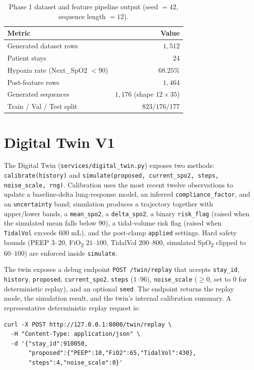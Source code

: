 \documentclass[12pt,a4paper,oneside]{report}
\begin{document}
\begin{table}[h]
\centering
\caption{Phase 1 dataset and feature pipeline output (seed $=42$, sequence length $=12$).}
\label{tab:phase1}
\begin{tabular}{lr}
\toprule
\textbf{Metric} & \textbf{Value}\\
\midrule
Generated dataset rows & $1{,}512$\\
Patient stays & $24$\\
Hypoxia rate (Next\_SpO2 $<90$) & $68.25\%$\\
Post-feature rows & $1{,}464$\\
Generated sequences & $1{,}176$ (shape $12 \times 35$)\\
Train / Val / Test split & $823 / 176 / 177$\\
\bottomrule
\end{tabular}
\end{table}

\section{Digital Twin V1}
The Digital Twin (\texttt{services/digital\_twin.py}) exposes two methods: \texttt{calibrate(history)} and \texttt{simulate(proposed, current\_spo2, steps, noise\_scale, rng)}. Calibration uses the most recent twelve observations to update a baseline-delta lung-response model, an inferred \texttt{compliance\_factor}, and an \texttt{uncertainty} band; simulation produces a trajectory together with upper/lower bands, a \texttt{mean\_spo2}, a \texttt{delta\_spo2}, a binary \texttt{risk\_flag} (raised when the simulated mean falls below $90$), a tidal-volume risk flag (raised when \texttt{TidalVol} exceeds $600$ mL), and the post-clamp \texttt{applied} settings. Hard safety bounds (PEEP $3$--$20$, FiO\textsubscript{2} $21$--$100$, TidalVol $200$--$800$, simulated SpO\textsubscript{2} clipped to $60$--$100$) are enforced inside \texttt{simulate}.

The twin exposes a debug endpoint \texttt{POST /twin/replay} that accepts \texttt{stay\_id}, \texttt{history}, \texttt{proposed}, \texttt{current\_spo2}, \texttt{steps} ($1$--$96$), \texttt{noise\_scale} ($\geq 0$, set to $0$ for deterministic replay), and an optional \texttt{seed}. The endpoint returns the replay mode, the simulation result, and the twin's internal calibration summary. A representative deterministic replay request is:
\begin{verbatim}
curl -X POST http://127.0.0.1:8000/twin/replay \
  -H "Content-Type: application/json" \
  -d '{"stay_id":910050,
       "proposed":{"PEEP":10,"FiO2":65,"TidalVol":430},
       "steps":4,"noise_scale":0}'
\end{verbatim}
\end{document}
